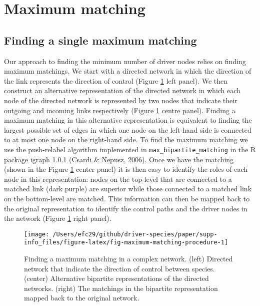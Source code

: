 \documentclass[a4paper]{artikel1}
\theoremstyle{definition}
\theoremstyle{definition}
\theoremstyle{definition}
\theoremstyle{remark}
\begin{document}
\newpage

\section{Maximum matching}\label{maximum-matching}

\subsection{Finding a single maximum
matching}\label{one-maximum-matching}

Our approach to finding the minimum number of driver nodes relies on
finding maximum matchings. We start with a directed network in which the
direction of the link represents the direction of control (Figure
\ref{fig:fig-maximum-matching-procedure} left panel). We then construct
an alternative representation of the directed network in which each node
of the directed network is represented by two nodes that indicate their
outgoing and incoming links respectively (Figure
\ref{fig:fig-maximum-matching-procedure} centre panel). Finding a
maximum matching in this alternative representation is equivalent to
finding the largest possible set of edges in which one node on the
left-hand side is connected to at most one node on the right-hand side.
To find the maximum matching we use the push-relabel algorithm
implemented in \texttt{max\_bipartite\_matching} in the R package igraph
1.0.1 (Csardi \& Nepusz, 2006). Once we have the matching (shown in the
Figure \ref{fig:fig-maximum-matching-procedure} center panel) it is then
easy to identify the roles of each node in this representation: nodes on
the top-level that are connected to a matched link (dark purple) are
superior while those connected to a matched link on the bottom-level are
matched. This information can then be mapped back to the original
representation to identify the control paths and the driver nodes in the
network (Figure \ref{fig:fig-maximum-matching-procedure} right panel).

\begin{figure}[p]

{\centering \texttt{[image: /Users/efc29/github/driver-species/paper/supp-info\_files/figure-latex/fig-maximum-matching-procedure-1]} 

}

\caption{Finding a maximum matching in a complex network. (left) Directed network that indicate the direction of control between species. (center) Alternative bipartite representations of the directed networks. (right) The matchings in the bipartite representation mapped back to the original network.}\label{fig:fig-maximum-matching-procedure}
\end{figure}
\end{document}
